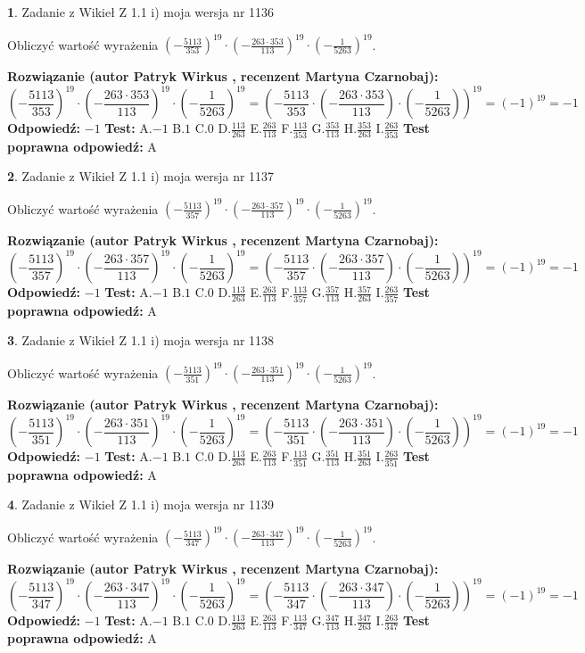 \documentclass[12pt, a4paper]{article}
\theoremstyle{definition} %
\newtheorem{zad}{}
\newcommand{\zadStart}[1]{\begin{zad}#1\newline}
\newcommand{\zadStop}{\end{zad}}
\newcommand{\rozwStart}[2]{\noindent \textbf{Rozwiązanie (autor #1 , recenzent #2): }\newline}
\newcommand{\rozwStop}{\newline}
\newcommand{\odpStart}{\noindent \textbf{Odpowiedź:}\newline}
\newcommand{\odpStop}{\newline}
\newcommand{\testStart}{\noindent \textbf{Test:}\newline}
\newcommand{\testStop}{\newline}
\newcommand{\kluczStart}{\noindent \textbf{Test poprawna odpowiedź:}\newline}
\newcommand{\kluczStop}{\newline}
\begin{document}
\zadStart{Zadanie z Wikieł Z 1.1 i) moja wersja nr 1136}

Obliczyć wartość wyrażenia $(-\frac{5113}{353})^{19} \cdot (-\frac{263 \cdot 353}{113})^{19} \cdot (-\frac{1}{5263})^{19}$.
\zadStop
\rozwStart{Patryk Wirkus}{Martyna Czarnobaj}
$$(-\frac{5113}{353})^{19} \cdot (-\frac{263 \cdot 353}{113})^{19} \cdot (-\frac{1}{5263})^{19} = (-\frac{5113}{353} \cdot (-\frac{263 \cdot 353}{113}) \cdot (-\frac{1}{5263}))^{19} = (-1)^{19} = -1$$
\rozwStop
\odpStart
$-1$
\odpStop
\testStart
A.$-1$ B.$1$ C.$0$ D.$\frac{113}{263}$ E.$\frac{263}{113}$
F.$\frac{113}{353}$ G.$\frac{353}{113}$
H.$\frac{353}{263}$
I.$\frac{263}{353}$
\testStop
\kluczStart
A
\kluczStop



\zadStart{Zadanie z Wikieł Z 1.1 i) moja wersja nr 1137}

Obliczyć wartość wyrażenia $(-\frac{5113}{357})^{19} \cdot (-\frac{263 \cdot 357}{113})^{19} \cdot (-\frac{1}{5263})^{19}$.
\zadStop
\rozwStart{Patryk Wirkus}{Martyna Czarnobaj}
$$(-\frac{5113}{357})^{19} \cdot (-\frac{263 \cdot 357}{113})^{19} \cdot (-\frac{1}{5263})^{19} = (-\frac{5113}{357} \cdot (-\frac{263 \cdot 357}{113}) \cdot (-\frac{1}{5263}))^{19} = (-1)^{19} = -1$$
\rozwStop
\odpStart
$-1$
\odpStop
\testStart
A.$-1$ B.$1$ C.$0$ D.$\frac{113}{263}$ E.$\frac{263}{113}$
F.$\frac{113}{357}$ G.$\frac{357}{113}$
H.$\frac{357}{263}$
I.$\frac{263}{357}$
\testStop
\kluczStart
A
\kluczStop



\zadStart{Zadanie z Wikieł Z 1.1 i) moja wersja nr 1138}

Obliczyć wartość wyrażenia $(-\frac{5113}{351})^{19} \cdot (-\frac{263 \cdot 351}{113})^{19} \cdot (-\frac{1}{5263})^{19}$.
\zadStop
\rozwStart{Patryk Wirkus}{Martyna Czarnobaj}
$$(-\frac{5113}{351})^{19} \cdot (-\frac{263 \cdot 351}{113})^{19} \cdot (-\frac{1}{5263})^{19} = (-\frac{5113}{351} \cdot (-\frac{263 \cdot 351}{113}) \cdot (-\frac{1}{5263}))^{19} = (-1)^{19} = -1$$
\rozwStop
\odpStart
$-1$
\odpStop
\testStart
A.$-1$ B.$1$ C.$0$ D.$\frac{113}{263}$ E.$\frac{263}{113}$
F.$\frac{113}{351}$ G.$\frac{351}{113}$
H.$\frac{351}{263}$
I.$\frac{263}{351}$
\testStop
\kluczStart
A
\kluczStop



\zadStart{Zadanie z Wikieł Z 1.1 i) moja wersja nr 1139}

Obliczyć wartość wyrażenia $(-\frac{5113}{347})^{19} \cdot (-\frac{263 \cdot 347}{113})^{19} \cdot (-\frac{1}{5263})^{19}$.
\zadStop
\rozwStart{Patryk Wirkus}{Martyna Czarnobaj}
$$(-\frac{5113}{347})^{19} \cdot (-\frac{263 \cdot 347}{113})^{19} \cdot (-\frac{1}{5263})^{19} = (-\frac{5113}{347} \cdot (-\frac{263 \cdot 347}{113}) \cdot (-\frac{1}{5263}))^{19} = (-1)^{19} = -1$$
\rozwStop
\odpStart
$-1$
\odpStop
\testStart
A.$-1$ B.$1$ C.$0$ D.$\frac{113}{263}$ E.$\frac{263}{113}$
F.$\frac{113}{347}$ G.$\frac{347}{113}$
H.$\frac{347}{263}$
I.$\frac{263}{347}$
\testStop
\kluczStart
A
\kluczStop
\end{document}
